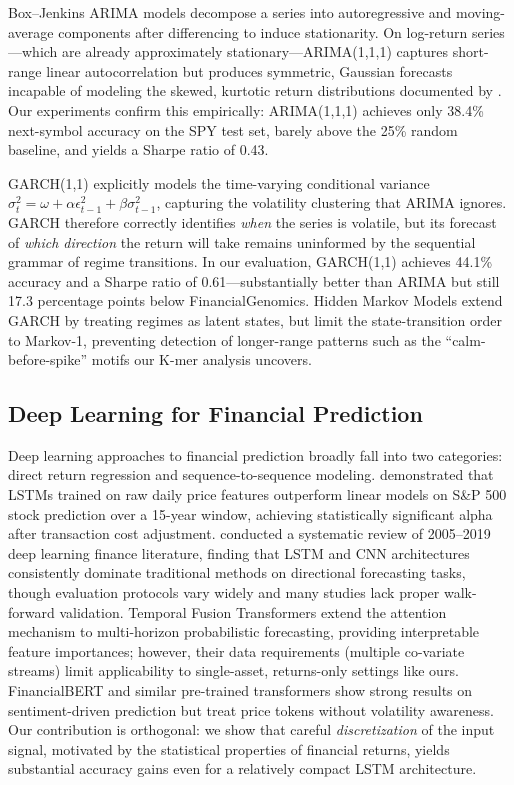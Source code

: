 \documentclass[11pt]{article}
\begin{document}
Box--Jenkins ARIMA models \citep{box1970distribution} decompose a
series into autoregressive and moving-average components after
differencing to induce stationarity.  On log-return series---which are
already approximately stationary---ARIMA(1,1,1) captures short-range
linear autocorrelation but produces symmetric, Gaussian forecasts
incapable of modeling the skewed, kurtotic return distributions
documented by \citet{mandelbrot1963variation}.  Our experiments confirm
this empirically: ARIMA(1,1,1) achieves only 38.4\% next-symbol
accuracy on the SPY test set, barely above the 25\% random baseline,
and yields a Sharpe ratio of 0.43.

GARCH(1,1) \citep{engle1982autoregressive,bollerslev1986generalized}
explicitly models the time-varying conditional variance
$\sigma_t^2 = \omega + \alpha \epsilon_{t-1}^2 + \beta \sigma_{t-1}^2$,
capturing the volatility clustering that ARIMA ignores.  GARCH
therefore correctly identifies \emph{when} the series is volatile, but
its forecast of \emph{which direction} the return will take remains
uninformed by the sequential grammar of regime transitions.
In our evaluation, GARCH(1,1) achieves 44.1\% accuracy and a Sharpe
ratio of 0.61---substantially better than ARIMA but still 17.3
percentage points below FinancialGenomics.  Hidden Markov Models
\citep{hassan2005stock} extend GARCH by treating regimes as latent
states, but limit the state-transition order to Markov-1, preventing
detection of longer-range patterns such as the ``calm-before-spike''
motifs our K-mer analysis uncovers.

\subsection{Deep Learning for Financial Prediction}

Deep learning approaches to financial prediction broadly fall into two
categories: direct return regression and sequence-to-sequence modeling.
\citet{fischer2018deep} demonstrated that LSTMs trained on raw daily
price features outperform linear models on S\&P 500 stock prediction
over a 15-year window, achieving statistically significant alpha after
transaction cost adjustment.  \citet{sezer2020financial} conducted a
systematic review of 2005--2019 deep learning finance literature,
finding that LSTM and CNN architectures consistently dominate
traditional methods on directional forecasting tasks, though evaluation
protocols vary widely and many studies lack proper walk-forward
validation.  Temporal Fusion Transformers \citep{lim2021temporal}
extend the attention mechanism to multi-horizon probabilistic
forecasting, providing interpretable feature importances; however,
their data requirements (multiple co-variate streams) limit
applicability to single-asset, returns-only settings like ours.
FinancialBERT \citep{yang2020finbert} and similar pre-trained
transformers show strong results on sentiment-driven prediction but
treat price tokens without volatility awareness.  Our contribution is
orthogonal: we show that careful \emph{discretization} of the input
signal, motivated by the statistical properties of financial returns,
yields substantial accuracy gains even for a relatively compact LSTM
architecture.
\end{document}
